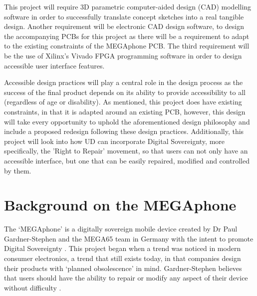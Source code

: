 This project will require 3D parametric computer-aided design (CAD) modelling software in order to successfully translate concept sketches into a real tangible design.
Another requirement will be electronic CAD design software, to design the accompanying PCBs for this project as there will be a requirement to adapt to the existing constraints of the MEGAphone PCB.
The third requirement will be the use of Xilinx's Vivado FPGA programming software in order to design accessible user interface features.

Accessible design practices will play a central role in the design process as the success of the final product depends on its ability to provide accessibility to all (regardless of age or disability). 
As mentioned, this project does have existing constraints, in that it is adapted around an existing PCB, however, this design will take every opportunity to uphold the aforementioned design philosophy and include a proposed redesign following these design practices.
Additionally, this project will look into how UD can incorporate Digital Sovereignty, more specifically, the 'Right to Repair' movement, so that users can not only have an accessible interface, but one that can be easily repaired, modified and controlled by them.



\section{Background on the MEGAphone}

The ‘MEGAphone’ is a digitally sovereign mobile device created by Dr Paul Gardner-Stephen and the MEGA65 team in Germany with the intent to promote Digital Sovereignty \cite{mega65}.
This project began when a trend was noticed in modern consumer electronics, a trend that still exists today, in that companies design their products with ‘planned obsolescence’ in mind. 
Gardner-Stephen believes that users should have the ability to repair or modify any aspect of their device without difficulty \cite{mobilehistory}.

